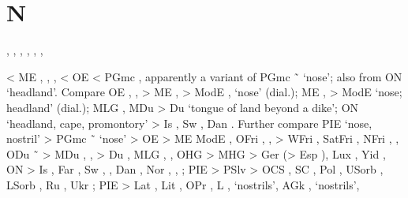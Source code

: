 \documentclass[12pt,letterpaper,oneside,article,draft]{memoir}
\begin{document}
\begin{Lemma}
\end{Lemma}

\begin{Lemma}
\end{Lemma}

\begin{Lemma}
\end{Lemma}

\section*{N}

\begin{Lemma}
\begin{Also}
	, , , , , , 
\end{Also}
\begin{Etymology}
	< ME , , ,  < OE  < PGmc , 
		apparently a variant of PGmc  \~\  ‘nose’; also from ON  ‘headland’.
	Compare
	OE , ,  > ME ,  > 
		ModE ,  ‘nose’ (dial.);
	ME ,  > ModE  ‘nose; headland’ (dial.);
	MLG , MDu  > Du  ‘tongue of land beyond a dike’;
	ON  ‘headland, cape, promontory’ > Is , Sw , Dan .
	Further compare
	PIE  ‘nose, nostril’ >
		PGmc  \~\  ‘nose’ > OE  > ME  ModE ,
			OFri , ,  > WFri , SatFri ,
				NFri , ,
			ODu  \~\  > MDu , ,  > Du ,
			MLG , ,
			OHG  > MHG  > Ger  (> Esp ), Lux ,
				Yid  ,
			ON  > Is , Far , Sw , , Dan ,
				Nor , , ;
	PIE  >
		PSlv  > OCS  , SC  , Pol ,
			USorb , LSorb , Ru  , Ukr  ;
	PIE  >
		Lat , Lit , OPr , L ,  ‘nostrils’,
		AGk  ,   ‘nostrils’,

\end{Etymology}
\end{Lemma}
\end{document}
